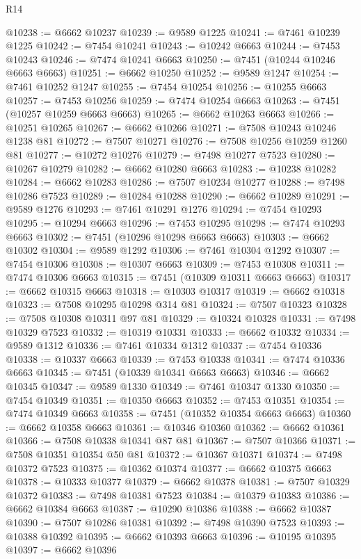 \begin{lexlean}{R14}
\begin{coremodule}
@10238 := @6662 @10237
@10239 := @9589 @1225
@10241 := @7461 @10239 @1225
@10242 := @7454 @10241
@10243 := @10242 @6663
@10244 := @7453 @10243
@10246 := @7474 @10241 @6663
@10250 := @7451 (@10244 @10246 @6663 @6663)
@10251 := @6662 @10250
@10252 := @9589 @1247
@10254 := @7461 @10252 @1247
@10255 := @7454 @10254
@10256 := @10255 @6663
@10257 := @7453 @10256
@10259 := @7474 @10254 @6663
@10263 := @7451 (@10257 @10259 @6663 @6663)
@10265 := @6662 @10263 @6663
@10266 := @10251 @10265
@10267 := @6662 @10266
@10271 := @7508 @10243 @10246 @1238 @81
@10272 := @7507 @10271
@10276 := @7508 @10256 @10259 @1260 @81
@10277 := @10272 @10276
@10279 := @7498 @10277 @7523
@10280 := @10267 @10279
@10282 := @6662 @10280 @6663
@10283 := @10238 @10282
@10284 := @6662 @10283
@10286 := @7507 @10234 @10277
@10288 := @7498 @10286 @7523
@10289 := @10284 @10288
@10290 := @6662 @10289
@10291 := @9589 @1276
@10293 := @7461 @10291 @1276
@10294 := @7454 @10293
@10295 := @10294 @6663
@10296 := @7453 @10295
@10298 := @7474 @10293 @6663
@10302 := @7451 (@10296 @10298 @6663 @6663)
@10303 := @6662 @10302
@10304 := @9589 @1292
@10306 := @7461 @10304 @1292
@10307 := @7454 @10306
@10308 := @10307 @6663
@10309 := @7453 @10308
@10311 := @7474 @10306 @6663
@10315 := @7451 (@10309 @10311 @6663 @6663)
@10317 := @6662 @10315 @6663
@10318 := @10303 @10317
@10319 := @6662 @10318
@10323 := @7508 @10295 @10298 @314 @81
@10324 := @7507 @10323
@10328 := @7508 @10308 @10311 @97 @81
@10329 := @10324 @10328
@10331 := @7498 @10329 @7523
@10332 := @10319 @10331
@10333 := @6662 @10332
@10334 := @9589 @1312
@10336 := @7461 @10334 @1312
@10337 := @7454 @10336
@10338 := @10337 @6663
@10339 := @7453 @10338
@10341 := @7474 @10336 @6663
@10345 := @7451 (@10339 @10341 @6663 @6663)
@10346 := @6662 @10345
@10347 := @9589 @1330
@10349 := @7461 @10347 @1330
@10350 := @7454 @10349
@10351 := @10350 @6663
@10352 := @7453 @10351
@10354 := @7474 @10349 @6663
@10358 := @7451 (@10352 @10354 @6663 @6663)
@10360 := @6662 @10358 @6663
@10361 := @10346 @10360
@10362 := @6662 @10361
@10366 := @7508 @10338 @10341 @87 @81
@10367 := @7507 @10366
@10371 := @7508 @10351 @10354 @50 @81
@10372 := @10367 @10371
@10374 := @7498 @10372 @7523
@10375 := @10362 @10374
@10377 := @6662 @10375 @6663
@10378 := @10333 @10377
@10379 := @6662 @10378
@10381 := @7507 @10329 @10372
@10383 := @7498 @10381 @7523
@10384 := @10379 @10383
@10386 := @6662 @10384 @6663
@10387 := @10290 @10386
@10388 := @6662 @10387
@10390 := @7507 @10286 @10381
@10392 := @7498 @10390 @7523
@10393 := @10388 @10392
@10395 := @6662 @10393 @6663
@10396 := @10195 @10395
@10397 := @6662 @10396

\end{coremodule}
\end{lexlean}
